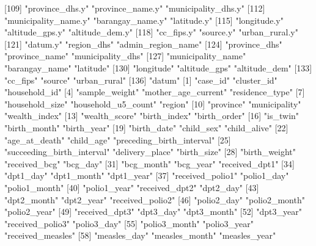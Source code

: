 [109] "province_dhs.y"            "province_name.y"           "municipality_dhs.y"       
[112] "municipality_name.y"       "barangay_name.y"           "latitude.y"               
[115] "longitude.y"               "altitude_gps.y"            "altitude_dem.y"           
[118] "cc_fips.y"                 "source.y"                  "urban_rural.y"            
[121] "datum.y"                   "region_dhs"                "admin_region_name"        
[124] "province_dhs"              "province_name"             "municipality_dhs"         
[127] "municipality_name"         "barangay_name"             "latitude"                 
[130] "longitude"                 "altitude_gps"              "altitude_dem"             
[133] "cc_fips"                   "source"                    "urban_rural"              
[136] "datum"                    
  [1] "case_id"                   "cluster_id"                "household_id"             
  [4] "sample_weight"             "mother_age_current"        "residence_type"           
  [7] "household_size"            "household_u5_count"        "region"                   
 [10] "province"                  "municipality"              "wealth_index"             
 [13] "wealth_score"              "birth_index"               "birth_order"              
 [16] "is_twin"                   "birth_month"               "birth_year"               
 [19] "birth_date"                "child_sex"                 "child_alive"              
 [22] "age_at_death"              "child_age"                 "preceding_birth_interval" 
 [25] "succeeding_birth_interval" "delivery_place"            "birth_size"               
 [28] "birth_weight"              "received_bcg"              "bcg_day"                  
 [31] "bcg_month"                 "bcg_year"                  "received_dpt1"            
 [34] "dpt1_day"                  "dpt1_month"                "dpt1_year"                
 [37] "received_polio1"           "polio1_day"                "polio1_month"             
 [40] "polio1_year"               "received_dpt2"             "dpt2_day"                 
 [43] "dpt2_month"                "dpt2_year"                 "received_polio2"          
 [46] "polio2_day"                "polio2_month"              "polio2_year"              
 [49] "received_dpt3"             "dpt3_day"                  "dpt3_month"               
 [52] "dpt3_year"                 "received_polio3"           "polio3_day"               
 [55] "polio3_month"              "polio3_year"               "received_measles"         
 [58] "measles_day"               "measles_month"             "measles_year"             
